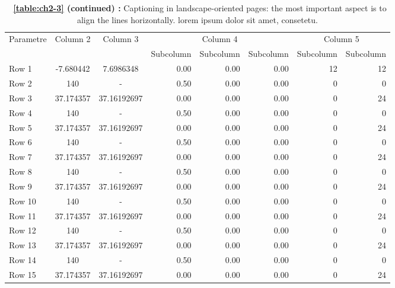 \begin{landscape}
\thispagestyle{empty}
\vspace{6pt} %
\begin{table}[htp]
\centering
\setlength{\tabcolsep}{14pt}
\captionsetup{justification=centerlast}
\caption*{\textbf{\tablename\ \ref{table:ch2-3} (continued) : } Captioning in landscape-oriented pages: the most important aspect is to align the lines horizontally. lorem ipsum dolor sit amet, consetetu.}
\begin{tabular}{lccrrrrr}
\toprule\midrule
\multirow{2}{*}{Parametre} & \multirow{2}{*}{Column 2} & \multirow{2}{*}{Column 3} & \multicolumn{3}{c}{Column 4} & \multicolumn{2}{c}{Column 5}\\ \cmidrule(lr){4-6} \cmidrule(lr){7-8}
  & & & Subcolumn & Subcolumn & Subcolumn & Subcolumn & Subcolumn\\
\midrule
Row 1 & -7.680442 & 7.6986348 & 0.00 & 0.00 & 0.00 & 12 & 12 \\
Row 2 & 140 & - & 0.50 & 0.00 & 0.00 & 0 & 0 \\
Row 3 & 37.174357 & 37.16192697 & 0.00 & 0.00 & 0.00 & 0 & 24 \\
Row 4 & 140 & - & 0.50 & 0.00 & 0.00 & 0 & 0 \\
Row 5 & 37.174357 & 37.16192697 & 0.00 & 0.00 & 0.00 & 0 & 24 \\
Row 6 & 140 & - & 0.50 & 0.00 & 0.00 & 0 & 0 \\
Row 7 & 37.174357 & 37.16192697 & 0.00 & 0.00 & 0.00 & 0 & 24 \\
Row 8 & 140 & - & 0.50 & 0.00 & 0.00 & 0 & 0 \\
Row 9 & 37.174357 & 37.16192697 & 0.00 & 0.00 & 0.00 & 0 & 24 \\
Row 10 & 140 & - & 0.50 & 0.00 & 0.00 & 0 & 0 \\
Row 11 & 37.174357 & 37.16192697 & 0.00 & 0.00 & 0.00 & 0 & 24 \\
Row 12 & 140 & - & 0.50 & 0.00 & 0.00 & 0 & 0 \\
Row 13 & 37.174357 & 37.16192697 & 0.00 & 0.00 & 0.00 & 0 & 24 \\
Row 14 & 140 & - & 0.50 & 0.00 & 0.00 & 0 & 0 \\
Row 15 & 37.174357 & 37.16192697 & 0.00 & 0.00 & 0.00 & 0 & 24 \\
\bottomrule
\end{tabular}
\end{table}
\vspace{-9pt} %
\vfill\hbox{ }

\ifodd\value{page} %
\end{landscape}

